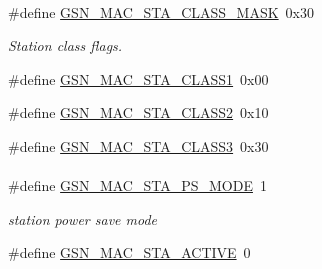 \paragraph*{}
\begin{DoxyCompactItemize}
\item 
\#define \hyperlink{a00642_ga01d15be8069f353fa7376360929eeb2f}{GSN\_\-MAC\_\-STA\_\-CLASS\_\-MASK}~0x30
\begin{DoxyCompactList}\small\item\em Station class flags. \end{DoxyCompactList}\item 
\#define \hyperlink{a00642_gaf0688616f5b52712d7fbc5f2a10896c1}{GSN\_\-MAC\_\-STA\_\-CLASS1}~0x00
\item 
\#define \hyperlink{a00642_ga0127205e69cce6c11a8b87d6562c5623}{GSN\_\-MAC\_\-STA\_\-CLASS2}~0x10
\item 
\#define \hyperlink{a00642_ga0da606a37b3024d9bf42760219f526be}{GSN\_\-MAC\_\-STA\_\-CLASS3}~0x30
\end{DoxyCompactItemize}

\paragraph*{}
\begin{DoxyCompactItemize}
\item 
\#define \hyperlink{a00642_gaab8abe9d2ed942b0aac9ae3f562e204a}{GSN\_\-MAC\_\-STA\_\-PS\_\-MODE}~1
\begin{DoxyCompactList}\small\item\em station power save mode \end{DoxyCompactList}\item 
\#define \hyperlink{a00642_gaa20efb0a2c9950b1601e9a681c9372be}{GSN\_\-MAC\_\-STA\_\-ACTIVE}~0
\end{DoxyCompactItemize}


